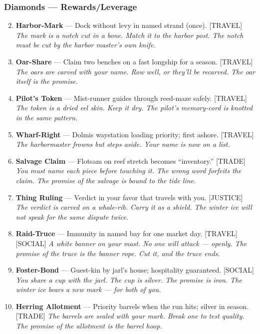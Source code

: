 \subsubsection*{Diamonds --- Rewards/Leverage}
\label{sec:linn-rewards}
\begin{enumerate}
\setcounter{enumi}{1}
\item \textbf{Harbor-Mark} --- Dock without levy in named strand (once). [TRAVEL]
  \hfill \textit{The mark is a notch cut in a bone. Match it to the harbor post. The notch must be cut by the harbor master's own knife.}
\item \textbf{Oar-Share} --- Claim two benches on a fast longship for a season. [TRAVEL]
  \hfill \textit{The oars are carved with your name. Row well, or they'll be recarved. The oar itself is the promise.}
\item \textbf{Pilot's Token} --- Mist-runner guides through reed-maze safely. [TRAVEL]
  \hfill \textit{The token is a dried eel skin. Keep it dry. The pilot's memory-cord is knotted in the same pattern.}
\item \textbf{Wharf-Right} --- Dolmis waystation loading priority; first ashore. [TRAVEL]
  \hfill \textit{The harbormaster frowns but steps aside. Your name is now on a list.}
\item \textbf{Salvage Claim} --- Flotsam on reef stretch becomes ``inventory.'' [TRADE]
  \hfill \textit{You must name each piece before touching it. The wrong word forfeits the claim. The promise of the salvage is bound to the tide line.}
\item \textbf{Thing Ruling} --- Verdict in your favor that travels with you. [JUSTICE]
  \hfill \textit{The verdict is carved on a whale-rib. Carry it as a shield. The winter ice will not speak for the same dispute twice.}
\item \textbf{Raid-Truce} --- Immunity in named bay for one market day. [TRAVEL] [SOCIAL]
  \hfill \textit{A white banner on your mast. No one will attack --- openly. The promise of the truce is the banner rope. Cut it, and the truce ends.}
\item \textbf{Foster-Bond} --- Guest-kin by jarl's house; hospitality guaranteed. [SOCIAL]
  \hfill \textit{You share a cup with the jarl. The cup is silver. The promise is iron. The winter ice bears a new mark --- for both of you.}
\item \textbf{Herring Allotment} --- Priority barrels when the run hits; silver in season. [TRADE]
  \hfill \textit{The barrels are sealed with your mark. Break one to test quality. The promise of the allotment is the barrel hoop.}

\end{enumerate}

